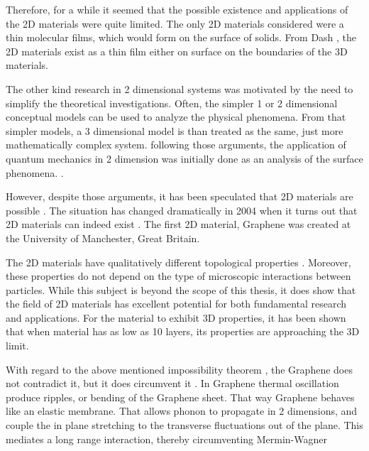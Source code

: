 Therefore, for a while it seemed that the possible existence and applications of the 2D materials were quite limited. The only 2D materials considered were a thin molecular films, which would form on the surface of solids. From Dash \cite{2DMatter1}, the 2D materials exist as a thin film either on surface on the boundaries of the 3D materials.

The other kind research in 2 dimensional systems was motivated by the need to simplify the theoretical investigations. Often, the simpler 1 or 2 dimensional conceptual models can be used to analyze the physical phenomena. From that simpler models, a 3 dimensional model is than treated as the same, just more mathematically complex system.  following those arguments, the application of  quantum mechanics in 2 dimension was initially done as an analysis of the surface phenomena. \cite{2dfilm}. 

However, despite those arguments, it has been speculated that 2D materials are possible \cite{2DMatter1}. The situation has changed dramatically in 2004 when it turns out that 2D materials can indeed exist \cite{Graphene0}. The first 2D material, Graphene was created \cite{GrapheneN} at the University of Manchester, Great Britain.

The 2D materials have qualitatively different topological properties \cite{2DMatterCurvature}. Moreover, these properties do not depend on the type of microscopic interactions between particles. While this subject is beyond the scope of this thesis, it does show that the field of 2D materials has excellent potential for both fundamental research and applications. For the material to exhibit 3D properties, it has been shown \cite{GraphLayers} that when material has as low as 10 layers, its properties are approaching the 3D limit.

With regard to the above mentioned impossibility theorem \cite{Mermin2}, the Graphene does not contradict it, but it does circumvent it \cite{GrapheneRiples}. In Graphene thermal oscillation produce ripples, or bending of the Graphene sheet. That way Graphene behaves like an elastic membrane. That allows phonon to propagate in 2 dimensions, and couple the in plane stretching to the transverse fluctuations out of the plane. This mediates a long range interaction, thereby circumventing Mermin-Wagner 

